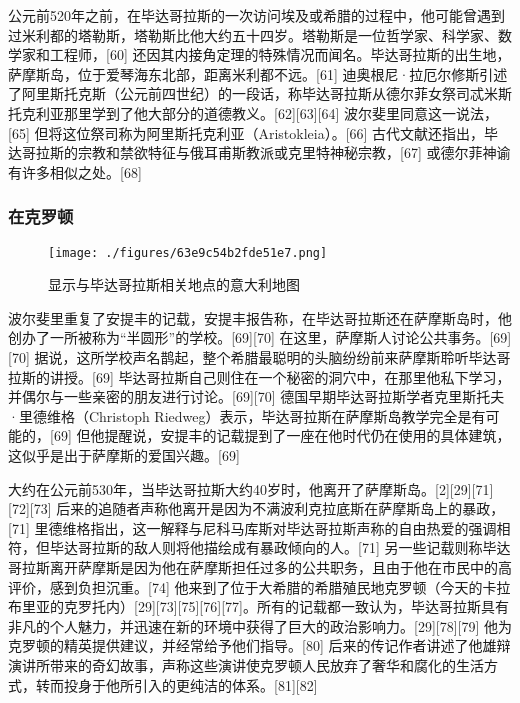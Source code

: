公元前520年之前，在毕达哥拉斯的一次访问埃及或希腊的过程中，他可能曾遇到过米利都的塔勒斯，塔勒斯比他大约五十四岁。塔勒斯是一位哲学家、科学家、数学家和工程师，[60] 还因其内接角定理的特殊情况而闻名。毕达哥拉斯的出生地，萨摩斯岛，位于爱琴海东北部，距离米利都不远。[61] 迪奥根尼·拉厄尔修斯引述了阿里斯托克斯（公元前四世纪）的一段话，称毕达哥拉斯从德尔菲女祭司忒米斯托克利亚那里学到了他大部分的道德教义。[62][63][64] 波尔斐里同意这一说法，[65] 但将这位祭司称为阿里斯托克利亚（Aristokleia）。[66] 古代文献还指出，毕达哥拉斯的宗教和禁欲特征与俄耳甫斯教派或克里特神秘宗教，[67] 或德尔菲神谕有许多相似之处。[68]
\subsubsection{在克罗顿}
\begin{figure}[ht]
\centering
\texttt{[image: ./figures/63e9c54b2fde51e7.png]}
\caption{显示与毕达哥拉斯相关地点的意大利地图} \label{fig_Pythag_5}
\end{figure}
波尔斐里重复了安提丰的记载，安提丰报告称，在毕达哥拉斯还在萨摩斯岛时，他创办了一所被称为“半圆形”的学校。[69][70] 在这里，萨摩斯人讨论公共事务。[69][70] 据说，这所学校声名鹊起，整个希腊最聪明的头脑纷纷前来萨摩斯聆听毕达哥拉斯的讲授。[69] 毕达哥拉斯自己则住在一个秘密的洞穴中，在那里他私下学习，并偶尔与一些亲密的朋友进行讨论。[69][70] 德国早期毕达哥拉斯学者克里斯托夫·里德维格（Christoph Riedweg）表示，毕达哥拉斯在萨摩斯岛教学完全是有可能的，[69] 但他提醒说，安提丰的记载提到了一座在他时代仍在使用的具体建筑，这似乎是出于萨摩斯的爱国兴趣。[69]

大约在公元前530年，当毕达哥拉斯大约40岁时，他离开了萨摩斯岛。[2][29][71][72][73] 后来的追随者声称他离开是因为不满波利克拉底斯在萨摩斯岛上的暴政，[71] 里德维格指出，这一解释与尼科马库斯对毕达哥拉斯声称的自由热爱的强调相符，但毕达哥拉斯的敌人则将他描绘成有暴政倾向的人。[71] 另一些记载则称毕达哥拉斯离开萨摩斯是因为他在萨摩斯担任过多的公共职务，且由于他在市民中的高评价，感到负担沉重。[74] 他来到了位于大希腊的希腊殖民地克罗顿（今天的卡拉布里亚的克罗托内）[29][73][75][76][77]。所有的记载都一致认为，毕达哥拉斯具有非凡的个人魅力，并迅速在新的环境中获得了巨大的政治影响力。[29][78][79] 他为克罗顿的精英提供建议，并经常给予他们指导。[80] 后来的传记作者讲述了他雄辩演讲所带来的奇幻故事，声称这些演讲使克罗顿人民放弃了奢华和腐化的生活方式，转而投身于他所引入的更纯洁的体系。[81][82]
